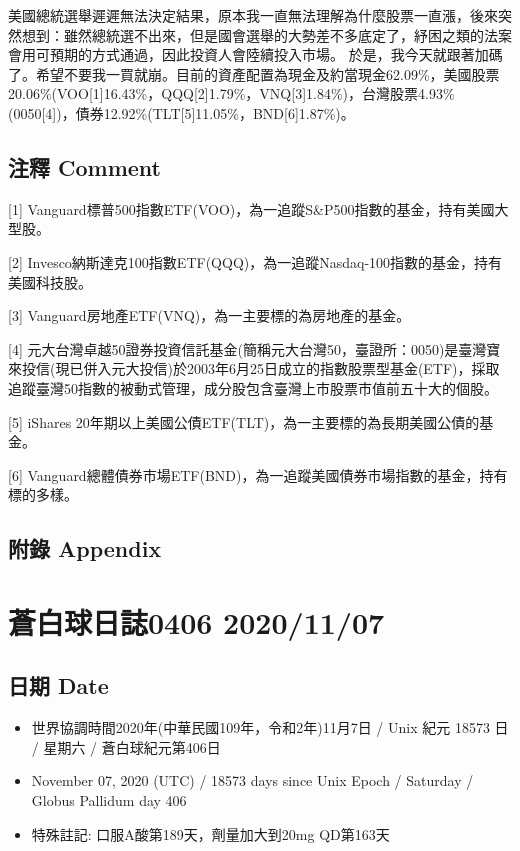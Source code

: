 \documentclass[a5paper, 11pt
]{book}
\providecommand{\tightlist}{%
  \setlength{\itemsep}{0pt}\setlength{\parskip}{0pt}}
\begin{document}
美國總統選舉遲遲無法決定結果，原本我一直無法理解為什麼股票一直漲，後來突然想到：雖然總統選不出來，但是國會選舉的大勢差不多底定了，紓困之類的法案會用可預期的方式通過，因此投資人會陸續投入市場。
於是，我今天就跟著加碼了。希望不要我一買就崩。目前的資產配置為現金及約當現金62.09\%，美國股票20.06\%(VOO{[}1{]}16.43\%，QQQ{[}2{]}1.79\%，VNQ{[}3{]}1.84\%)，台灣股票4.93\%(0050{[}4{]})，債券12.92\%(TLT{[}5{]}11.05\%，BND{[}6{]}1.87\%)。

\hypertarget{ux6ce8ux91cb-comment-62}{%
\subsection{注釋 Comment}\label{ux6ce8ux91cb-comment-62}}

{[}1{]}
Vanguard標普500指數ETF(VOO)，為一追蹤S\&P500指數的基金，持有美國大型股。

{[}2{]}
Invesco納斯達克100指數ETF(QQQ)，為一追蹤Nasdaq-100指數的基金，持有美國科技股。

{[}3{]} Vanguard房地產ETF(VNQ)，為一主要標的為房地產的基金。

{[}4{]}
元大台灣卓越50證券投資信託基金(簡稱元大台灣50，臺證所：0050)是臺灣寶來投信(現已併入元大投信)於2003年6月25日成立的指數股票型基金(ETF)，採取追蹤臺灣50指數的被動式管理，成分股包含臺灣上市股票市值前五十大的個股。

{[}5{]} iShares
20年期以上美國公債ETF(TLT)，為一主要標的為長期美國公債的基金。

{[}6{]}
Vanguard總體債券市場ETF(BND)，為一追蹤美國債券市場指數的基金，持有標的多樣。

\hypertarget{ux9644ux9304-appendix-62}{%
\subsection{附錄 Appendix}\label{ux9644ux9304-appendix-62}}

\hypertarget{ux84bcux767dux7403ux65e5ux8a8c0406-20201107}{%
\section{蒼白球日誌0406
2020/11/07}\label{ux84bcux767dux7403ux65e5ux8a8c0406-20201107}}

\hypertarget{ux65e5ux671f-date-63}{%
\subsection{日期 Date}\label{ux65e5ux671f-date-63}}

\begin{itemize}
\tightlist
\item
  世界協調時間2020年(中華民國109年，令和2年)11月7日 / Unix 紀元 18573 日
  / 星期六 / 蒼白球紀元第406日
\item
  November 07, 2020 (UTC) / 18573 days since Unix Epoch / Saturday /
  Globus Pallidum day 406
\item
  特殊註記: 口服A酸第189天，劑量加大到20mg QD第163天
\end{itemize}
\end{document}
